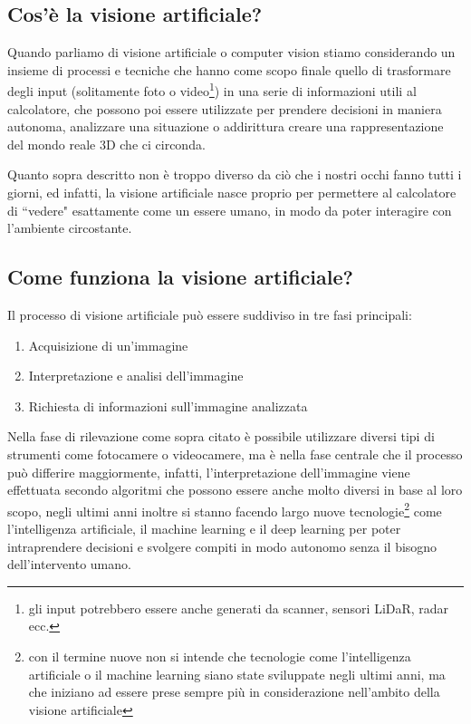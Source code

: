 \documentclass[12pt,a4paper,openright,twoside]{book}
\begin{document}
\subsection{Cos'è la visione artificiale?}
Quando parliamo di visione artificiale o computer vision stiamo considerando un insieme di processi e tecniche che hanno come scopo finale quello di trasformare degli input (solitamente foto o video\footnote{gli input potrebbero essere anche generati da scanner, sensori LiDaR, radar ecc.}) in una serie di informazioni utili al calcolatore, che possono poi essere utilizzate per prendere decisioni in maniera autonoma, analizzare una situazione o addirittura creare una rappresentazione del mondo reale 3D che ci circonda. \cite{bradski2008learning} \cite{microsoftArtificialVision}

Quanto sopra descritto non è troppo diverso da ciò che i nostri occhi fanno tutti i giorni, ed infatti, la visione artificiale nasce proprio per permettere al calcolatore di ``vedere" esattamente come un essere umano, in modo da poter interagire con l'ambiente circostante.

\subsection{Come funziona la visione artificiale?}
Il processo di visione artificiale può essere suddiviso in tre fasi principali:
\begin{enumerate}
	\item Acquisizione di un'immagine
	\item Interpretazione e analisi dell'immagine
	\item Richiesta di informazioni sull'immagine analizzata
\end{enumerate}
Nella fase di rilevazione come sopra citato è possibile utilizzare diversi tipi di strumenti come fotocamere o videocamere, ma è nella fase centrale che il processo può differire maggiormente, infatti, l'interpretazione dell'immagine viene effettuata secondo algoritmi che possono essere anche molto diversi in base al loro scopo, negli ultimi anni inoltre si stanno facendo largo nuove tecnologie\footnote{con il termine nuove non si intende che tecnologie come l'intelligenza artificiale o il machine learning siano state sviluppate negli ultimi anni, ma che iniziano ad essere prese sempre più in considerazione nell'ambito della visione artificiale} come l'intelligenza artificiale, il machine learning e il deep learning per poter intraprendere decisioni e svolgere compiti in modo autonomo senza il bisogno dell'intervento umano.
\end{document}
